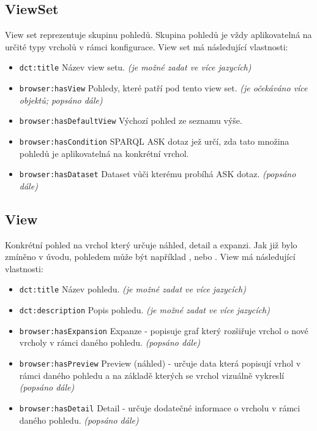 \subsection{ViewSet} \label{pozadavky-view-sets}
View set reprezentuje skupinu pohledů. Skupina pohledů je vždy aplikovatelná na určité typy vrcholů v rámci konfigurace. View set má následující vlastnosti:
\begin{itemize}
    \item \texttt{dct:title} Název view setu. \textit{(je možné zadat ve více jazycích)}
    \item \texttt{browser:hasView} Pohledy, které patří pod tento view set. \textit{(je očekáváno více objektů; popsáno dále)}
    \item \texttt{browser:hasDefaultView} Výchozí pohled ze seznamu výše.
    \item \texttt{browser:hasCondition} SPARQL ASK dotaz jež určí, zda tato množina pohledů je aplikovatelná na konkrétní vrchol.
    \item \texttt{browser:hasDataset} Dataset vůči kterému probíhá ASK dotaz. \textit{(popsáno dále)}
\end{itemize}

\subsection{View} \label{pozadavky-view}
Konkrétní pohled na vrchol který určuje náhled, detail a expanzi. Jak již bylo zmíněno v úvodu, pohledem může být například , nebo . View má následující vlastnosti:

\begin{itemize}
    \item \texttt{dct:title} Název pohledu. \textit{(je možné zadat ve více jazycích)}
    \item \texttt{dct:description} Popis pohledu. \textit{(je možné zadat ve více jazycích)}
    \item \texttt{browser:hasExpansion} Expanze -  popisuje graf který rozšiřuje vrchol o nové vrcholy v rámci daného pohledu. \textit{(popsáno dále)}
    \item \texttt{browser:hasPreview} Preview (náhled) - určuje data která popisují vrhol v rámci daného pohledu a na základě kterých se vrchol vizuálně vykreslí \textit{(popsáno dále)}
    \item \texttt{browser:hasDetail} Detail - určuje dodatečné informace o vrcholu v rámci daného pohledu. \textit{(popsáno dále)}
\end{itemize}

